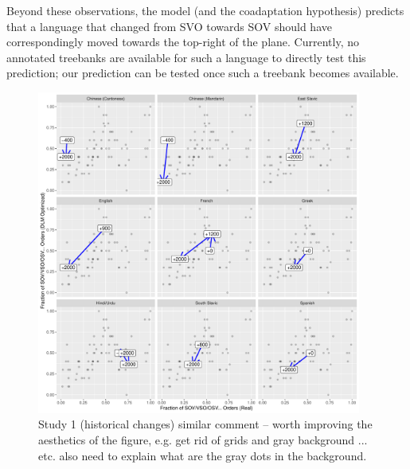 \documentclass[11pt,a4paper]{article}
\newcommand\comment[1]{{\color{red}#1}}
\newcommand\mhahn[1]{{\color{red}(#1)}}
\begin{document}



Beyond these observations, the model (and the coadaptation hypothesis) predicts that a language that changed from SVO towards SOV should have correspondingly moved towards the top-right of the plane. 
Currently, no annotated treebanks are available for such a language to directly test this prediction; our prediction can be tested once such a treebank becomes available.



\begin{figure}
    \centering
    \includegraphics[width=0.95\textwidth]{figures/historical_2.6_times.pdf}
    \caption{Study 1 (historical changes) \comment{similar comment -- worth improving the aesthetics of the figure, e.g. get rid of grids and gray background ... etc. also need to explain what are the gray dots in the background.}}
    \label{fig:historical}
\end{figure}
\end{document}
